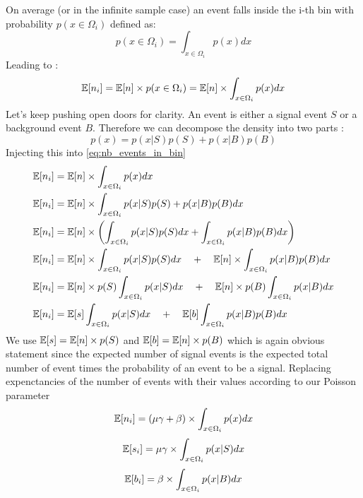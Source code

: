On average (or in the infinite sample case) an event falls inside the i-th bin with probability $p(x \in \Omega_i)$ defined as:
\begin{equation}
	p(x \in \Omega_i) = \int_{x \in \Omega_i} p(x) dx
\end{equation}
Leading to :
\begin{equation}
	\label{eq:nb_events_in_bin}
	\mathbb{E} [n_i] = \mathbb{E} [n] \times p(x \in \Omega_i)  = \mathbb{E}[n] \times \int_{x \in \Omega_i} p(x) dx
\end{equation}
Let's keep pushing open doors for clarity.
An event is either a signal event $S$ or a background event $B$.
Therefore we can decompose the density into two parts :
\begin{equation}
	p(x) = p(x|S) p(S) + p(x|B) p(B)
\end{equation}
Injecting this into \autoref{eq:nb_events_in_bin}
\begin{align}
	\mathbb{E} [n_i] &= \mathbb{E}[n] \times \int_{x \in \Omega_i} p(x) dx \\
	\mathbb{E} [n_i] &= \mathbb{E}[n] \times \int_{x \in \Omega_i} p(x|S) p(S) + p(x|B) p(B) dx \\
	\mathbb{E} [n_i] &= \mathbb{E}[n] \times \left ( \int_{x \in \Omega_i} p(x|S) p(S) dx + \int_{x \in \Omega_i}  p(x|B) p(B) dx \right )\\
	\mathbb{E} [n_i] &= \mathbb{E}[n] \times \int_{x \in \Omega_i} p(x|S) p(S) dx \quad+\quad \mathbb{E}[n] \times \int_{x \in \Omega_i}  p(x|B) p(B) dx \\
	\mathbb{E} [n_i] &= \mathbb{E}[n] \times p(S) \int_{x \in \Omega_i} p(x|S) dx \quad+\quad \mathbb{E}[n] \times p(B) \int_{x \in \Omega_i}  p(x|B) dx \\
	\mathbb{E} [n_i] &= \mathbb{E}[s] \int_{x \in \Omega_i} p(x|S) dx \quad+\quad \mathbb{E}[b] \int_{x \in \Omega_i}  p(x|B) p(B) dx \\
\end{align}
We use $\mathbb{E}[s] = \mathbb{E}[n] \times p(S)$ and $\mathbb{E}[b] = \mathbb{E}[n] \times p(B)$ which is again obvious statement since the expected number of signal events is the expected total number of event times the probability of an event to be a signal.
Replacing expenctancies of the number of events with their values according to our Poisson parameter
\begin{equation}
	\mathbb{E}[n_i] = (\mu\gamma + \beta) \times \int_{x \in \Omega_i} p(x) dx
\end{equation}
\begin{equation}
	\mathbb{E}[s_i] = \mu\gamma \times \int_{x \in \Omega_i} p(x|S) dx
\end{equation}
\begin{equation}
	\mathbb{E}[b_i] = \beta \times \int_{x \in \Omega_i} p(x|B) dx
\end{equation}

